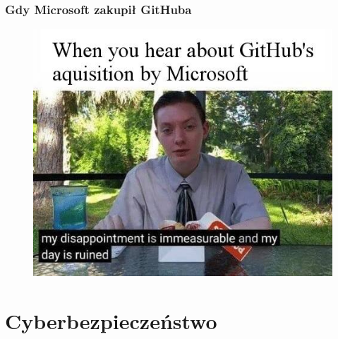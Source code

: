 \documentclass[10pt,t]{beamer}
\begin{document}
\begin{frame}
  \frametitle{Gdy Microsoft zakupił GitHuba}


  \begin{figure}

    \centering


    \includegraphics[scale=0.5]
    {./PresentationsPictures/Microsoft-buying-GitHub.jpg}

  \end{figure}

\end{frame}










\section{Cyberbezpieczeństwo}
\end{document}
